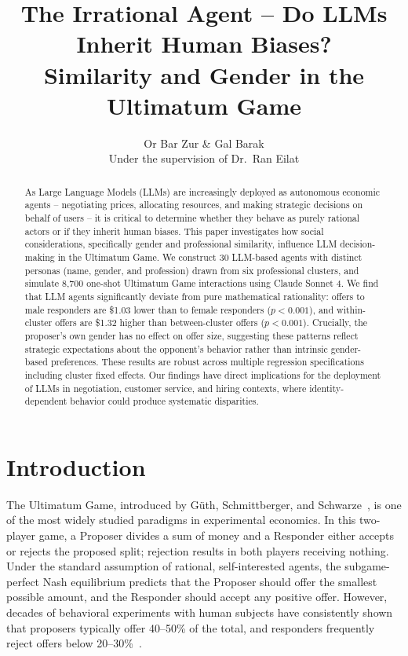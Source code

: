 \documentclass[12pt]{article}
\title{The Irrational Agent -- Do LLMs Inherit Human Biases?\\
\large Similarity and Gender in the Ultimatum Game}
\author{Or Bar Zur \& Gal Barak\\
\small Under the supervision of Dr.\ Ran Eilat}
\date{}
\begin{document}
\maketitle

\begin{abstract}
As Large Language Models (LLMs) are increasingly deployed as autonomous economic agents -- negotiating prices, allocating resources, and making strategic decisions on behalf of users -- it is critical to determine whether they behave as purely rational actors or if they inherit human biases. This paper investigates how social considerations, specifically gender and professional similarity, influence LLM decision-making in the Ultimatum Game. We construct 30 LLM-based agents with distinct personas (name, gender, and profession) drawn from six professional clusters, and simulate 8,700 one-shot Ultimatum Game interactions using Claude Sonnet 4. We find that LLM agents significantly deviate from pure mathematical rationality: offers to male responders are \$1.03 lower than to female responders ($p < 0.001$), and within-cluster offers are \$1.32 higher than between-cluster offers ($p < 0.001$). Crucially, the proposer's own gender has no effect on offer size, suggesting these patterns reflect strategic expectations about the opponent's behavior rather than intrinsic gender-based preferences. These results are robust across multiple regression specifications including cluster fixed effects. Our findings have direct implications for the deployment of LLMs in negotiation, customer service, and hiring contexts, where identity-dependent behavior could produce systematic disparities.
\end{abstract}

\section{Introduction}

The Ultimatum Game, introduced by G\"{u}th, Schmittberger, and Schwarze~\cite{guth1982}, is one of the most widely studied paradigms in experimental economics. In this two-player game, a Proposer divides a sum of money and a Responder either accepts or rejects the proposed split; rejection results in both players receiving nothing. Under the standard assumption of rational, self-interested agents, the subgame-perfect Nash equilibrium predicts that the Proposer should offer the smallest possible amount, and the Responder should accept any positive offer. However, decades of behavioral experiments with human subjects have consistently shown that proposers typically offer 40--50\% of the total, and responders frequently reject offers below 20--30\%~\cite{camerer2003}.
\end{document}
